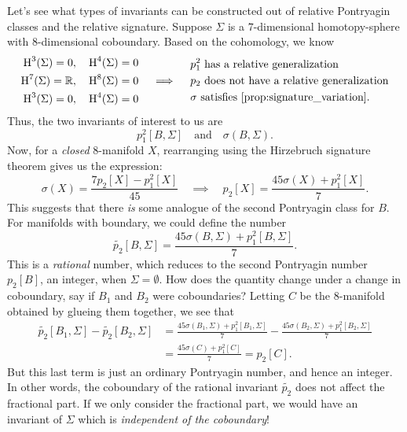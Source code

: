 Let's see what types of invariants can be constructed out of relative Pontryagin classes and the relative signature. Suppose $\Sigma$ is a $7$-dimensional homotopy-sphere with $8$-dimensional coboundary. Based on the cohomology, we know
\[
	\begin{aligned}
		\H^3(\Sigma)=0,  & \quad \H^4(\Sigma)=0 \\
		\H^7(\Sigma)=\R, & \quad \H^8(\Sigma)=0 \\
		\H^3(\Sigma)=0,  & \quad \H^4(\Sigma)=0
	\end{aligned}
	\quad\implies\quad
	\begin{aligned}
		 & p_1^2\textrm{ has a relative generalization}               \\
		 & p_2\textrm{ does not have a relative generalization}       \\
		 & \sigma\textrm{ satisfies \cref{prop:signature_variation}.}
	\end{aligned}
\]
Thus, the two invariants of interest to us are
\[
	p_1^2[B,\Sigma]
	\quad\textrm{and}\quad
	\sigma(B, \Sigma).
\]
Now, for a \emph{closed} $8$-manifold $X$, rearranging using the Hirzebruch signature theorem gives us the expression:
\[
	\sigma(X) = \frac{7p_2[X] - p_1^2[X]}{45}
	\quad\implies\quad
	p_2[X] = \frac{45\sigma(X) + p_1^2[X]}{7}.
\]
This suggests that there \emph{is} some analogue of the second Pontryagin class for $B$. For manifolds with boundary, we could define the number
\[
	\widetilde{p_2}[B, \Sigma] = \frac{45\sigma(B, \Sigma) + p_1^2[B, \Sigma]}{7}.
\]
This is a \emph{rational} number,
which reduces to the second Pontryagin number $p_2[B]$, an integer, when $\Sigma=\emptyset$. How does the quantity change under a change in coboundary, say if $B_1$ and $B_2$ were coboundaries? Letting $C$ be the $8$-manifold obtained by glueing them together, we see that
\[
	\begin{aligned}
		\widetilde{p_2}[B_1,\Sigma] - \widetilde{p_2}[B_2,\Sigma]
		 & = \frac{45\sigma(B_1,\Sigma) + p_1^2[B_1,\Sigma]}{7} - \frac{45\sigma(B_2, \Sigma) + p_1^2[B_2,\Sigma]}{7} \\
		 & =\frac{45\sigma(C) + p_1^2[C]}{7} = p_2[C].
	\end{aligned}
\]
But this last term is just an ordinary Pontryagin number, and hence an integer. In other words, the coboundary of the rational invariant $\widetilde{p_2}$ does not affect the fractional part. If we only consider the fractional part, we would have an invariant of $\Sigma$ which is \emph{independent of the coboundary}!

